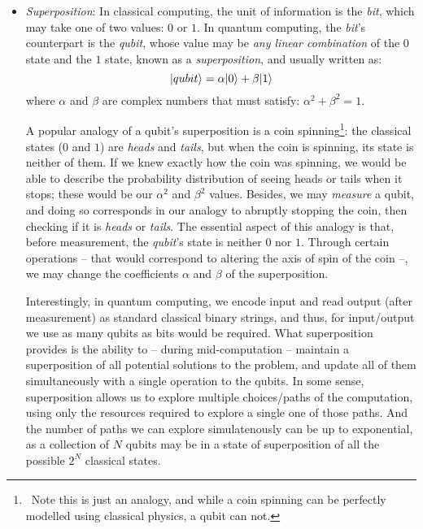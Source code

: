 \begin{itemize}

  \item \textit{Superposition}: In classical computing, the unit of information is the \textit{bit}, which may take one of two values: \(0\) or \(1\). In quantum computing, the \textit{bit}'s counterpart is the \textit{qubit}, whose value may be \textit{any linear combination} of the \(0\) state and the \(1\) state, known as a \textit{superposition}, and usually written as: \[\vert qubit \rangle = \alpha\vert 0 \rangle + \beta\vert 1 \rangle\] where \(\alpha\) and \(\beta\) are complex numbers that must satisfy: \(\alpha^2 + \beta^2 = 1\).

  A popular analogy of a qubit's superposition is a coin spinning\footnote{\, Note this is just an analogy, and while a coin spinning can be perfectly modelled using classical physics, a qubit can not.}: the classical states (\(0\) and \(1\)) are \textit{heads} and \textit{tails}, but when the coin is spinning, its state is neither of them. If we knew exactly how the coin was spinning, we would be able to describe the probability distribution of seeing heads or tails when it stops; these would be our \(\alpha^2\) and \(\beta^2\) values. Besides, we may \textit{measure} a qubit, and doing so corresponds in our analogy to abruptly stopping the coin, then checking if it is \textit{heads} or \textit{tails}. The essential aspect of this analogy is that, before measurement, the \textit{qubit}'s state is neither \(0\) nor \(1\). Through certain operations -- that would correspond to altering the axis of spin of the coin --, we may change the coefficients \(\alpha\) and \(\beta\) of the superposition. 

  Interestingly, in quantum computing, we encode input and read output (after measurement) as standard classical binary strings, and thus, for input/output we use as many qubits as bits would be required. What superposition provides is the ability to -- during mid-computation -- maintain a superposition of all potential solutions to the problem, and update all of them simultaneously with a single operation to the qubits. In some sense, superposition allows us to explore multiple choices/paths of the computation, using only the resources required to explore a single one of those paths. And the number of paths we can explore simulatenously can be up to exponential, as a collection of \(N\) qubits may be in a state of superposition of all the possible \(2^N\) classical states.


\end{itemize}
